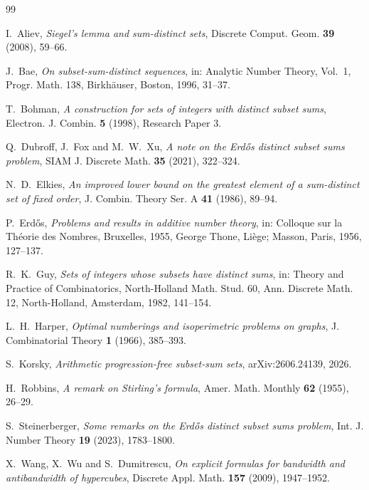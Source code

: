 \documentclass[10pt]{amsart}
\numberwithin{equation}{section}
\begin{document}
{
\begin{thebibliography}{99}
\setlength{\itemsep}{1pt}

I.~Aliev,
\newblock \emph{Siegel's lemma and sum-distinct sets},
\newblock Discrete Comput. Geom. \textbf{39} (2008), 59--66.

J.~Bae,
\newblock \emph{On subset-sum-distinct sequences},
\newblock in: Analytic Number Theory, Vol.~1, Progr. Math. 138,
Birkh\"auser, Boston, 1996, 31--37.

T.~Bohman,
\newblock \emph{A construction for sets of integers with distinct subset sums},
\newblock Electron. J. Combin. \textbf{5} (1998), Research Paper 3.

Q.~Dubroff, J.~Fox and M.~W.~Xu,
\newblock \emph{A note on the Erd\H{o}s distinct subset sums problem},
\newblock SIAM J. Discrete Math. \textbf{35} (2021), 322--324.

N.~D.~Elkies,
\newblock \emph{An improved lower bound on the greatest element of a sum-distinct set of fixed order},
\newblock J. Combin. Theory Ser. A \textbf{41} (1986), 89--94.

P.~Erd\H{o}s,
\newblock \emph{Problems and results in additive number theory},
\newblock in: Colloque sur la Th\'eorie des Nombres, Bruxelles, 1955,
George Thone, Li\`ege; Masson, Paris, 1956, 127--137.

R.~K.~Guy,
\newblock \emph{Sets of integers whose subsets have distinct sums},
\newblock in: Theory and Practice of Combinatorics, North-Holland Math. Stud. 60,
Ann. Discrete Math. 12, North-Holland, Amsterdam, 1982, 141--154.

L.~H.~Harper,
\newblock \emph{Optimal numberings and isoperimetric problems on graphs},
\newblock J. Combinatorial Theory \textbf{1} (1966), 385--393.

S.~Korsky,
\newblock \emph{Arithmetic progression-free subset-sum sets},
\newblock arXiv:2606.24139, 2026.

H.~Robbins,
\newblock \emph{A remark on Stirling's formula},
\newblock Amer. Math. Monthly \textbf{62} (1955), 26--29.

S.~Steinerberger,
\newblock \emph{Some remarks on the Erd\H{o}s distinct subset sums problem},
\newblock Int. J. Number Theory \textbf{19} (2023), 1783--1800.

X.~Wang, X.~Wu and S.~Dumitrescu,
\newblock \emph{On explicit formulas for bandwidth and antibandwidth of hypercubes},
\newblock Discrete Appl. Math. \textbf{157} (2009), 1947--1952.

\end{thebibliography}
}
\end{document}
